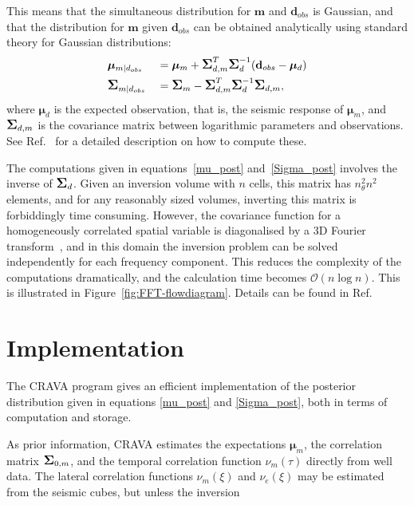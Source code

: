 \documentclass[screen,citenumeric,long,10pt]{nrdoc_060418}
\newcommand{\vect}[1]{\ensuremath{\mathbf{#1}}}
\newcommand{\bmu}{\bm\mu}
\newcommand{\bSigma}{\mbox{\large\ensuremath{\boldsymbol{\Sigma}}}}
\newcommand{\cml}{\nu_m}
\newcommand{\cel}{\nu_e}
\newcommand{\cmt}{\nu_m}
\newcommand{\crava} {\textsf{CRAVA}\xspace}
\begin{document}
\begin{multicols}{2}
This means that the simultaneous distribution for $\vect{m}$ and
$\vect{d}_{obs}$ is Gaussian, and that the distribution for $\vect{m}$
given $\vect{d}_{obs}$ can be obtained analytically using standard
theory for Gaussian distributions:
%
\begin{alignat}{2}
  &\bmu_{m|d_{obs}}    &&=\bmu_{m} +\bSigma_{d,m}^T \bSigma_{d}^{-1}
                           (\vect{d}_{obs}-\bmu_{d})     \label{mu_post} \\
  &\bSigma_{m|d_{obs}} &&=\bSigma_{m} - \bSigma_{d,m}^T
                           \bSigma_{d}^{-1}\bSigma_{d,m},\label{Sigma_post}
\end{alignat}
%
where $\bmu_{d}$ is the expected observation, that is, the
seismic response of $\bmu_m$, and $\bSigma_{d,m}$ is the
covariance matrix between logarithmic parameters and
observations. See Ref.~\cite{geo68ab1} for a detailed description on
how to compute these.

The computations given in equations~\eqref{mu_post}
and~\eqref{Sigma_post} involves the inverse of $\bSigma_{d}$. Given an
inversion volume with $n$ cells, this matrix has $n_\theta^2n^2$
elements, and for any reasonably sized volumes, inverting this matrix
is forbiddingly time consuming. However, the covariance function for a
homogeneously correlated spatial variable is diagonalised by a 3D
Fourier transform~\cite{christakos92}, and in this domain the inversion
problem can be solved independently for each frequency component. This
reduces the complexity of the computations dramatically, and the
calculation time becomes $\mathcal{O}(n\log n)$. This is illustrated
in Figure~\ref{fig:FFT-flowdiagram}. Details can be found in
Ref.~\cite{geo68ab2}

\section{Implementation}
\label{sec:crava}

The \crava program gives an efficient implementation of the posterior
distribution given in equations \eqref{mu_post} and
\eqref{Sigma_post}, both in terms of computation and storage. 

As prior information, \crava estimates the
expectations $\bmu_m$, the correlation matrix $\bSigma_{0,m}$, and the
temporal correlation function $\cmt(\tau)$ directly from well
data. The lateral correlation functions $\cml(\xi)$ and $\cel(\xi)$
may be estimated from the seismic cubes, but unless the inversion 


\end{multicols}
\end{document}
